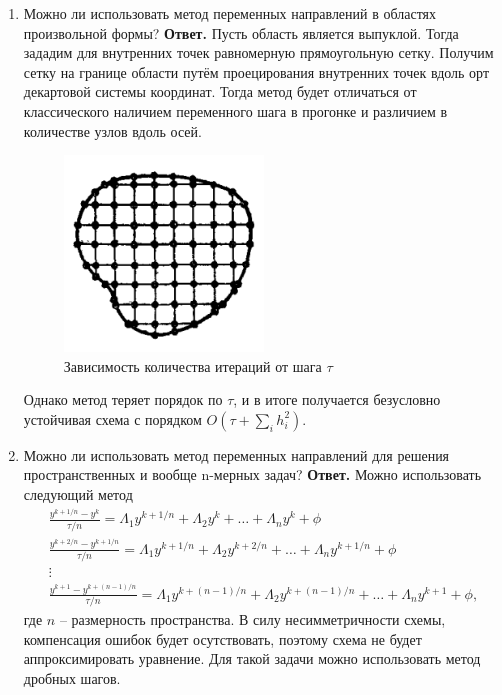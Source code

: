 \documentclass{article}
\begin{document}
\begin{enumerate}
		\item Можно ли использовать метод переменных направлений в
		областях произвольной формы?
		\newline 
		{\bfseries Ответ. } 
		Пусть область является выпуклой. 
		Тогда зададим для внутренних точек равномерную прямоугольную сетку. 
		Получим сетку на границе области путём проецирования внутренних точек вдоль 
		орт декартовой системы координат.
		Тогда метод будет отличаться от классического наличием переменного шага в прогонке
		и различием в количестве узлов вдоль осей.  
		\begin{figure}[H]
			\centering
			\includegraphics[width=0.5\textwidth]{sector.png}
			\caption{Зависимость количества итераций от шага $\tau$}
		\end{figure}	
		Однако метод теряет порядок по $\tau$, и в итоге получается безусловно устойчивая схема 
		с порядком $O(\tau + \sum_{i} h^2_i)$.
		\item Можно ли использовать метод переменных направлений
		для решения пространственных и вообще n-мерных задач?
		\newline
		{\bfseries Ответ. } 
		Можно использовать следующий метод 
		\begin{gather*}
			\frac{y^{k+1/n} - y^k}{\tau/n} = \Lambda_1 y^{k+1/n} + \Lambda_2 y^k
			+ \ldots + \Lambda_n y^k  + \phi \\
			\frac{y^{k+2/n} - y^{k+1/n}}{\tau/n} = \Lambda_1 y^{k+1/n} + \Lambda_2 y^{k+2/n}
			+ \ldots + \Lambda_n y^{k+1/n}  + \phi \\
			\vdots \\ 
			\frac{y^{k+1} - y^{k+(n-1)/n}}{\tau/n} = \Lambda_1 y^{k+(n-1)/n} + \Lambda_2 y^{k+(n-1)/n}
			+ \ldots + \Lambda_n y^{k+1}  + \phi,
		\end{gather*}
		где $n$ -- размерность пространства.
		В силу несимметричности схемы, компенсация ошибок будет осутствовать, поэтому 
		схема не будет аппроксимировать уравнение. 
		Для такой задачи можно использовать метод дробных шагов.


\end{enumerate}
\end{document}
